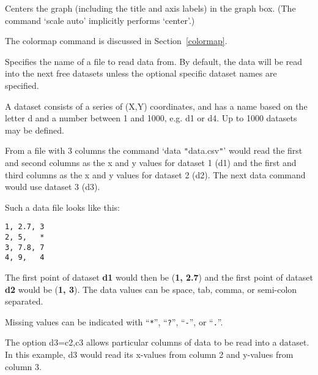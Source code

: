 \begin{commanddescription}
\item[{\sf center}]
Centers the graph (including the title and axis labels) in the graph box. (The command `{\sf scale auto}' implicitly performs `{\sf center}'.)

\item [{\sf colormap {\it fct} {\it pixels-x} {\it pixels-y} [{\it color}] [{\it invert}] [{\it zmin} $z_1$]  [{\it zmax} $z_2$] [{\it palette} {\it pal}]}]

The colormap command is discussed in Section~\ref{colormap}.

\item[{\sf data {\it filename {\sf [}d1 d2 d3 ...{\sf ] [}d1=c1,c3 ...{\sf ]}} [ignore {\it n}] [comment {\it char}]}]
\label{cmd:data}
Specifies the name of a file to read data from.  By default,
the data will be read into the next free datasets unless the
optional specific dataset names are specified.

A dataset consists of a series of (X,Y) coordinates, and has a
name based on the letter {\sf d} and a number between 1 and 1000,
e.g. {\sf d1} or {\sf d4}. Up to 1000 datasets may be defined.

From a file with 3 columns the command
`{\sf data \verb+"+data.csv\verb+"+}' would read the first and second columns as the x and y values for dataset 1 (d1) and the first and third columns as the x and y values for dataset 2 (d2). The next {\sf data} command would use dataset 3 (d3).

Such a data file looks like this:

\begin{Verbatim}
1, 2.7, 3
2, 5,   *
3, 7.8, 7
4, 9,   4
\end{Verbatim}

The first point of dataset {\bf d1} would then be ({\bf 1, 2.7}) and the first point of dataset {\bf d2} would be ({\bf 1, 3}). The data values can be space, tab, comma, or semi-colon separated.

Missing values can be indicated with ``\verb+*+'', ``\verb+?+'', ``\verb+-+'', or ``\verb+.+''.

The option {\sf d3=c2,c3} allows particular columns of data to be read into a dataset. In this example, d3 would read its x-values from column 2 and y-values from column 3.


\end{commanddescription}
